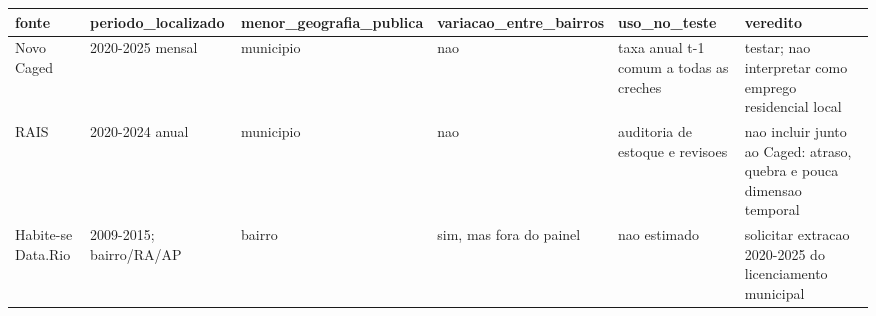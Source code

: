 \begin{tabular}{llllll}
\toprule
fonte & periodo_localizado & menor_geografia_publica & variacao_entre_bairros & uso_no_teste & veredito \\
\midrule
Novo Caged & 2020-2025 mensal & municipio & nao & taxa anual t-1 comum a todas as creches & testar; nao interpretar como emprego residencial local \\
RAIS & 2020-2024 anual & municipio & nao & auditoria de estoque e revisoes & nao incluir junto ao Caged: atraso, quebra e pouca dimensao temporal \\
Habite-se Data.Rio & 2009-2015; bairro/RA/AP & bairro & sim, mas fora do painel & nao estimado & solicitar extracao 2020-2025 do licenciamento municipal \\
\bottomrule
\end{tabular}
